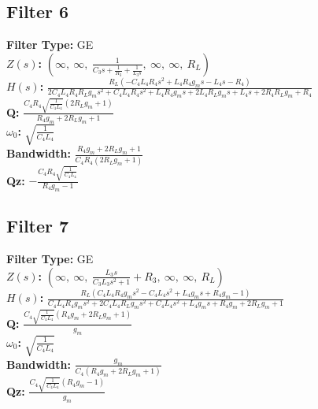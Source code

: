 \documentclass{article}
\begin{document}
\subsection*{Filter 6}
\textbf{Filter Type:} GE \\ 
\textbf{$Z(s)$:} $\left( \infty, \  \infty, \  \frac{1}{C_{3} s + \frac{1}{R_{3}} + \frac{1}{L_{3} s}}, \  \infty, \  \infty, \  R_{L}\right)$ \\ 
\textbf{$H(s)$:} $\frac{R_{L} \left(- C_{4} L_{4} R_{4} s^{2} + L_{4} R_{4} g_{m} s - L_{4} s - R_{4}\right)}{2 C_{4} L_{4} R_{4} R_{L} g_{m} s^{2} + C_{4} L_{4} R_{4} s^{2} + L_{4} R_{4} g_{m} s + 2 L_{4} R_{L} g_{m} s + L_{4} s + 2 R_{4} R_{L} g_{m} + R_{4}}$ \\ 
\textbf{Q:} $\frac{C_{4} R_{4} \sqrt{\frac{1}{C_{4} L_{4}}} \left(2 R_{L} g_{m} + 1\right)}{R_{4} g_{m} + 2 R_{L} g_{m} + 1}$ \\ 
\textbf{$\omega_0$:} $\sqrt{\frac{1}{C_{4} L_{4}}}$ \\ 
\textbf{Bandwidth:} $\frac{R_{4} g_{m} + 2 R_{L} g_{m} + 1}{C_{4} R_{4} \left(2 R_{L} g_{m} + 1\right)}$ \\ 
\textbf{Qz:} $- \frac{C_{4} R_{4} \sqrt{\frac{1}{C_{4} L_{4}}}}{R_{4} g_{m} - 1}$ \\ 
\subsection*{Filter 7}
\textbf{Filter Type:} GE \\ 
\textbf{$Z(s)$:} $\left( \infty, \  \infty, \  \frac{L_{3} s}{C_{3} L_{3} s^{2} + 1} + R_{3}, \  \infty, \  \infty, \  R_{L}\right)$ \\ 
\textbf{$H(s)$:} $\frac{R_{L} \left(C_{4} L_{4} R_{4} g_{m} s^{2} - C_{4} L_{4} s^{2} + L_{4} g_{m} s + R_{4} g_{m} - 1\right)}{C_{4} L_{4} R_{4} g_{m} s^{2} + 2 C_{4} L_{4} R_{L} g_{m} s^{2} + C_{4} L_{4} s^{2} + L_{4} g_{m} s + R_{4} g_{m} + 2 R_{L} g_{m} + 1}$ \\ 
\textbf{Q:} $\frac{C_{4} \sqrt{\frac{1}{C_{4} L_{4}}} \left(R_{4} g_{m} + 2 R_{L} g_{m} + 1\right)}{g_{m}}$ \\ 
\textbf{$\omega_0$:} $\sqrt{\frac{1}{C_{4} L_{4}}}$ \\ 
\textbf{Bandwidth:} $\frac{g_{m}}{C_{4} \left(R_{4} g_{m} + 2 R_{L} g_{m} + 1\right)}$ \\ 
\textbf{Qz:} $\frac{C_{4} \sqrt{\frac{1}{C_{4} L_{4}}} \left(R_{4} g_{m} - 1\right)}{g_{m}}$ \\ 
\end{document}
